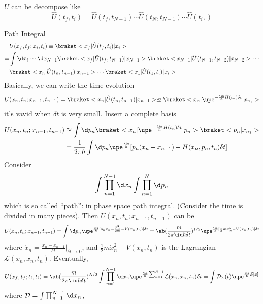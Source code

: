 \begin{enumext}[label = (\alph*)]
\begin{center}
\begin{minipage}{.42\linewidth}
      \end{minipage}
    \end{center}
    $U$ can be decompose like
    \[
      \hat U(t_f,t_i) = \hat U(t_f,t_{N-1}) \cdots \hat U(t_N,t_{N-1}) \cdots \hat U(t_i,)
    \]
    \item Path Integral
    \begin{align*}
      & U(x_f,t_f;x_i,t_i) \equiv \braket<x_f|\hat U(t_f,t_i)|x_i>\\
    = & \int \d x_i \cdots \d x_{N-1} \braket<x_f |\hat U(t_f,t_{N-1})|x_{N-1}>
    \braket<x_{N-1}|\hat U(t_{N-1},t_{N-2})|x_{N-2}> \cdots\\
    & \braket<x_n |\hat U(t_n,t_{n-1})|x_{n-1}> \cdots \braket<x_1|\hat U(t_1,t_i)|x_i>
    \end{align*}
    Basically, we can write the time evolution
    \[
      U(x_n,t_n;x_{n-1},t_{n-1}) = \braket<x_n |\hat U(t_n,t_{n-1})|x_{n-1}> \approxeq \braket<x_n|\upe^{-\frac\iu\hbar\hat H(t_n) \delta t}|x_{n_1}>
    \]
    it's vavid when $\delta t$ is very small.
    Insert a complete basis
    \begin{align*}
      U(x_n,t_n;x_{n-1},t_{n-1}) & \approxeq
      \int \d p_n \braket<x_n|\upe^{-\frac\iu\hbar\hat H(t_n) \delta t}|p_n>\braket<p_n|x_{n_1}>\\
      & = \frac1{2\pi\hbar} \int \d p_n \upe^{\frac\iu\hbar}[p_n(x_n - x_{n-1}) - H(x_n,p_n,t_n)\delta t]
    \end{align*}
  Consider
  \[
    \int \prod_{n=1}^{N-1} \d x_n \int\prod_{n=1}^N \d p_n
  \]
  which is so called ``path'': in phase space path integral.
  (Consider the time is divided in many pieces).
  Then $U(x_n,t_n;x_{n-1},t_{n-1})$ can be
  \[
    U(x_n,t_n;x_{n-1},t_{n-1}) = \int \d p_n \upe^{\frac{\iu}{\hbar} [p_n\dot x_n - \frac{p_n^2}{2m} - V(x_n,t_n)]\delta t}
  = \ab(\frac m{2\pi\iu\hbar\delta t})^{1/2} \upe^{\frac\iu\hbar[\frac12m\dot x_n^2 - V(x_n,t_n)]\delta t}
  \]
  where $\dot x_n = \frac{x_n - x_{n-1}}{\delta t}\big|_{\delta t \to 0}$,
  and $\frac12m\dot x_n^2 - V(x_n,t_n)$ is the Lagrangian $\mathcal L(x_n,\dot x_n,t_n)$.
  Eventually,
  \[
    U(x_f,t_f;t_i,t_i) = \ab(\frac m{2\pi\iu\hbar\delta t})^{N/2}
    \int \prod_{n=1}^{N-1} \d x_n \upe^{\frac\iu\hbar \sum_{n=1}^{N-1}}
    \mathcal L(x_n,\dot x_n,t_n) \delta t
  = \int \mathcal D x(t) \upe^{\frac\iu\hbar\mathcal S[x]}
  \]
  where $\mathcal D = \int \prod_{n=1}^{N-1} \d x_n$,

\end{enumext}
